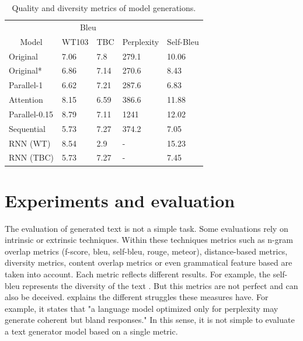 \documentclass[10pt,twocolumn,letterpaper]{article}
\begin{document}
\begin{table}[]
\begin{tabular}{lllll}
\hline
\multicolumn{1}{c}{} & \multicolumn{2}{c}{Bleu} & \multicolumn{1}{c}{\multirow{}{}{}} & \multicolumn{1}{c}{} \\ \cline{2-3}
\multicolumn{1}{c}{\multirow{}{}{Model}}   & WT103       & TBC        & \multicolumn{1}{c}{\multirow{}{}{Perplexity}} & Self-Bleu  \\ \hline
Original \cite{wang2019bert}                & 7.06        & 7.8        & 279.1        & 10.06                                            \\
Original*                            & 6.86        & 7.14        & 270.6             & 8.43                                  \\
Parallel-1                                 & 6.62        & 7.21       & 287.6                    & 6.83                           \\
Attention                                 & 8.15        & 6.59       & 386.6                  &  11.88                          \\
Parallel-0.15                              & 8.79            & 7.11           & 1241         & 12.02                                       \\
Sequential                                & 5.73            & 7.27           & 374.2          & 7.05                                      \\
RNN (WT)                                & 8.54            & 2.9           & -                  & 15.23                              \\
RNN (TBC)                                & 5.73            & 7.27           & -                & 7.45                                \\ \hline
\end{tabular}
\caption{Quality and diversity metrics of model generations.}
\label{tab:results}
\end{table}

\section{Experiments and evaluation}

The evaluation of generated text is not a simple task.
Some evaluations rely on intrinsic or extrinsic techniques.
Within these techniques metrics such as n-gram overlap metrics (f-score, bleu, self-bleu, rouge, meteor),
distance-based metrics, diversity metrics, content overlap metrics or even grammatical feature based
are taken into account.
Each metric reflects different results.
For example, the self-bleu represents the diversity of the text \cite{texygen}.
But this metrics are not perfect and can also be deceived.
\cite{evaltextgen1} explains the different struggles these measures have.
For example, it states that "a language model optimized only for perplexity
may generate coherent but bland responses."
In this sense, it is not simple to evaluate a text generator model based on a single metric.
\end{document}
